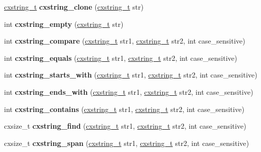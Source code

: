 \begin{DoxyCompactItemize}
\hyperlink{a00072}{cxstring\+\_\+t} {\bfseries cxstring\+\_\+clone} (\hyperlink{a00072}{cxstring\+\_\+t} str)
\item 
\mbox{\label{a00026_af879ce4f5ad5c766d6e85e7091b535c0}} 
int {\bfseries cxstring\+\_\+empty} (\hyperlink{a00072}{cxstring\+\_\+t} str)
\item 
\mbox{\label{a00026_a9ab6eca9b23e57aaeb9497bad9f0e780}} 
int {\bfseries cxstring\+\_\+compare} (\hyperlink{a00072}{cxstring\+\_\+t} str1, \hyperlink{a00072}{cxstring\+\_\+t} str2, int case\+\_\+sensitive)
\item 
\mbox{\label{a00026_a04b30db16aa250d2693bb2a240c1df6b}} 
int {\bfseries cxstring\+\_\+equals} (\hyperlink{a00072}{cxstring\+\_\+t} str1, \hyperlink{a00072}{cxstring\+\_\+t} str2, int case\+\_\+sensitive)
\item 
\mbox{\label{a00026_aa5a66d6c99bbb3d8305334c5a694f096}} 
int {\bfseries cxstring\+\_\+starts\+\_\+with} (\hyperlink{a00072}{cxstring\+\_\+t} str1, \hyperlink{a00072}{cxstring\+\_\+t} str2, int case\+\_\+sensitive)
\item 
\mbox{\label{a00026_aeab236e5406de3a806354d555ac3b9a6}} 
int {\bfseries cxstring\+\_\+ends\+\_\+with} (\hyperlink{a00072}{cxstring\+\_\+t} str1, \hyperlink{a00072}{cxstring\+\_\+t} str2, int case\+\_\+sensitive)
\item 
\mbox{\label{a00026_ac570d3c2e46b7fd8b110f26afd9ba306}} 
int {\bfseries cxstring\+\_\+contains} (\hyperlink{a00072}{cxstring\+\_\+t} str1, \hyperlink{a00072}{cxstring\+\_\+t} str2, int case\+\_\+sensitive)
\item 
\mbox{\label{a00026_ab5102cb0231f838e4d55e7dd0e21cdd9}} 
cxsize\+\_\+t {\bfseries cxstring\+\_\+find} (\hyperlink{a00072}{cxstring\+\_\+t} str1, \hyperlink{a00072}{cxstring\+\_\+t} str2, int case\+\_\+sensitive)
\item 
\mbox{\label{a00026_aa8ec55f4db6bac0c10db887d97688d61}} 
cxsize\+\_\+t {\bfseries cxstring\+\_\+span} (\hyperlink{a00072}{cxstring\+\_\+t} str1, \hyperlink{a00072}{cxstring\+\_\+t} str2, int case\+\_\+sensitive)
\item 
\mbox{\label{a00026_a13c33626c74c9bc0ab4cd08058b19f1f}} 

\end{DoxyCompactItemize}
